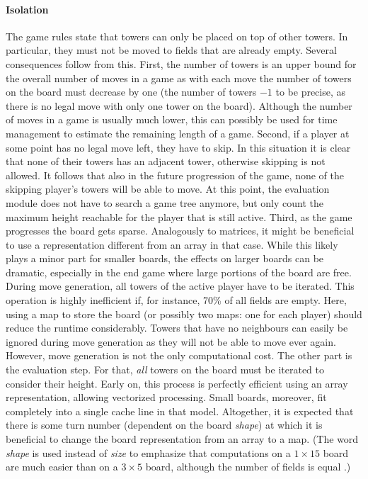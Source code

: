 \documentclass[sigconf]{acmart}
\begin{document}
\paragraph{Isolation}
The game rules state that towers can only be placed on top of other towers.
In particular, they must not be moved to fields that are already empty.
Several consequences follow from this.
First, the number of towers is an upper bound for the overall number of moves in a game as with each move the number of towers on the board must decrease by one (the number of towers $-1$ to be precise, as there is no legal move with only one tower on the board).
Although the number of moves in a game is usually much lower, this can possibly be used for time management to estimate the remaining length of a game.
Second, if a player at some point has no legal move left, they have to skip.
In this situation it is clear that none of their towers has an adjacent tower, otherwise skipping is not allowed.
It follows that also in the future progression of the game, none of the skipping player's towers will be able to move.
At this point, the evaluation module does not have to search a game tree anymore, but only count the maximum height reachable for the player that is still active.
Third, as the game progresses the board gets sparse.
Analogously to matrices, it might be beneficial to use a representation different from an array in that case.
While this likely plays a minor part for smaller boards, the effects on larger boards can be dramatic, especially in the end game where large portions of the board are free.
During move generation, all towers of the active player have to be iterated.
This operation is highly inefficient if, for instance, 70\% of all fields are empty.
Here, using a map to store the board (or possibly two maps: one for each player) should reduce the runtime considerably.
Towers that have no neighbours can easily be ignored during move generation as they will not be able to move ever again.
However, move generation is not the only computational cost.
The other part is the evaluation step.
For that, \emph{all} towers on the board must be iterated to consider their height.
Early on, this process is perfectly efficient using an array representation, allowing vectorized processing.
Small boards, moreover, fit completely into a single cache line in that model.
Altogether, it is expected that there is some turn number (dependent on the board \emph{shape}) at which it is beneficial to change the board representation from an array to a map.
(The word \emph{shape} is used instead of \emph{size} to emphasize that computations on a $1\times15$ board are much easier than on a $3\times5$ board, although the number of fields is equal \cite{Althöfer2020}.)
\end{document}
